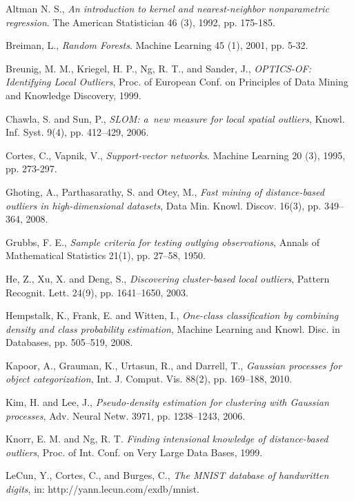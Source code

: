 \documentclass{llncs}
\begin{document}
\begin{thebibliography}{1}
	

Altman N. S., \emph{An introduction to kernel and nearest-neighbor nonparametric regression}. The American Statistician 46 (3), 1992, pp. 175-185.

Breiman, L., \emph{Random Forests}. Machine Learning 45 (1), 2001, pp. 5-32. 

Breunig, M. M., Kriegel, H. P., Ng, R. T., and Sander, J., \emph{OPTICS-OF: Identifying Local Outliers}, Proc. of European Conf. on Principles of Data Mining and Knowledge Discovery, 1999.

Chawla, S. and Sun, P., \emph{SLOM: a~new measure for local spatial outliers}, Knowl. Inf. Syst. 9(4), pp. 412--429, 2006.

Cortes, C., Vapnik, V., \emph{Support-vector networks}. Machine Learning 20 (3), 1995, pp. 273-297.

Ghoting, A., Parthasarathy, S. and Otey, M., \emph{Fast mining of distance-based outliers in high-dimensional datasets}, Data Min. Knowl. Discov. 16(3), pp. 349--364, 2008.

Grubbs, F. E., \emph{Sample criteria for testing outlying observations}, Annals of Mathematical Statistics 21(1), pp. 27--58, 1950. 

He, Z., Xu, X. and Deng, S., \emph{Discovering cluster-based local outliers}, Pattern Recognit. Lett. 24(9), pp. 1641--1650, 2003.

Hempstalk, K., Frank, E. and Witten, I., \emph{One-class classification by combining density and class probability estimation}, Machine Learning and Knowl. Disc. in Databases, pp. 505--519, 2008.

Kapoor, A., Grauman, K., Urtasun, R., and Darrell, T., \emph{Gaussian processes for object categorization}, Int. J. Comput. Vis. 88(2), pp. 169--188, 2010.

Kim, H. and Lee, J., \emph{Pseudo-density estimation for clustering with Gaussian processes}, Adv. Neural Netw. 3971, pp. 1238--1243, 2006.

Knorr, E. M. and Ng, R. T. \emph{Finding intensional knowledge of distance-based outliers}, Proc. of Int. Conf. on Very Large Data Bases, 1999.

LeCun, Y., Cortes, C., and Burges, C., \emph{The MNIST database of handwritten digits}, in: http://yann.lecun.com/exdb/mnist.


\end{thebibliography}
\end{document}
